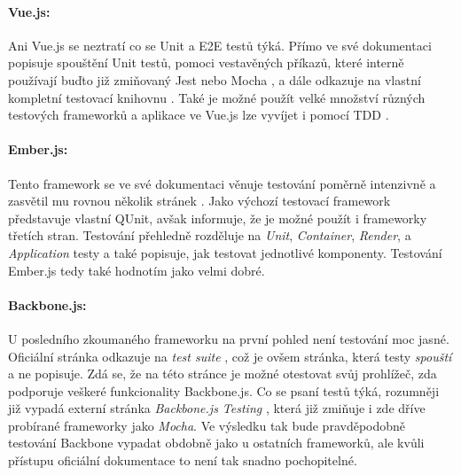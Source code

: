 \paragraph{Vue.js:} Ani Vue.js se neztratí co se Unit a E2E testů týká. Přímo ve své dokumentaci \cite{vue-test} popisuje spouštění Unit testů, pomoci vestavěných příkazů, které interně používají buďto již zmiňovaný Jest nebo Mocha \cite{mocha}, a dále odkazuje na vlastní kompletní testovací knihovnu \cite{vue-test-utils}. Také je možné použít velké množství různých testových frameworků a aplikace ve Vue.js lze vyvíjet i pomocí TDD \cite{vue-tdd}.

\paragraph{Ember.js:} Tento framework se ve své dokumentaci věnuje testování poměrně intenzivně a zasvětil mu rovnou několik stránek \cite{ember-test}. Jako výchozí testovací framework představuje vlastní QUnit, avšak informuje, že je možné použít i frameworky třetích stran. Testování přehledně rozděluje na \emph{Unit}, \emph{Container}, \emph{Render}, a \emph{Application} testy a také popisuje, jak testovat jednotlivé komponenty. Testování Ember.js tedy také hodnotím jako velmi dobré.

\paragraph{Backbone.js:} U posledního zkoumaného frameworku na první pohled není testování moc jasné. Oficiální stránka odkazuje na \emph{test suite} \cite{backbone-test}, což je ovšem stránka, která testy \emph{spouští} a ne popisuje. Zdá se, že na této stránce je možné otestovat svůj prohlížeč, zda podporuje veškeré funkcionality Backbone.js. Co se psaní testů týká, rozumněji již vypadá externí stránka \emph{Backbone.js Testing} \cite{backbone-testing}, která již zmiňuje i zde dříve probírané frameworky jako \emph{Mocha}. Ve výsledku tak bude pravděpodobně testování Backbone vypadat obdobně jako u ostatních frameworků, ale kvůli přístupu oficiální dokumentace to není tak snadno pochopitelné.

